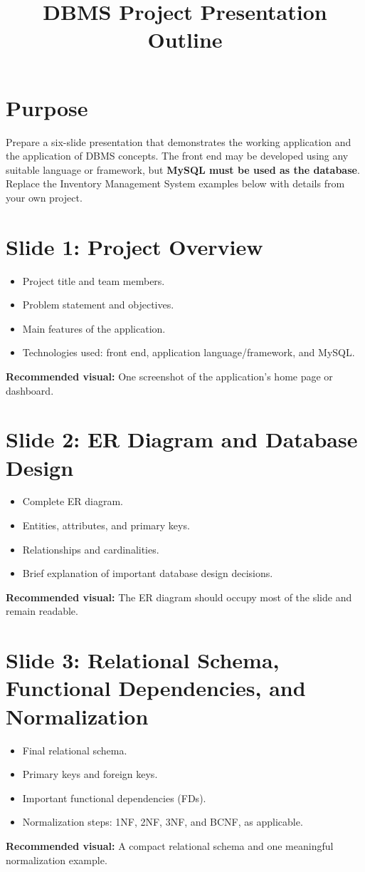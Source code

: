 \documentclass[12pt,a4paper]{article}
\title{\textbf{DBMS Project Presentation Outline}}
\author{}
\date{}
\begin{document}
\maketitle

\section*{Purpose}
Prepare a six-slide presentation that demonstrates the working application and the application of DBMS concepts. The front end may be developed using any suitable language or framework, but \textbf{MySQL must be used as the database}. Replace the Inventory Management System examples below with details from your own project.

\section*{Slide 1: Project Overview}
\begin{itemize}
    \item Project title and team members.
    \item Problem statement and objectives.
    \item Main features of the application.
    \item Technologies used: front end, application language/framework, and MySQL.
\end{itemize}
\textbf{Recommended visual:} One screenshot of the application's home page or dashboard.

\section*{Slide 2: ER Diagram and Database Design}
\begin{itemize}
    \item Complete ER diagram.
    \item Entities, attributes, and primary keys.
    \item Relationships and cardinalities.
    \item Brief explanation of important database design decisions.
\end{itemize}
\textbf{Recommended visual:} The ER diagram should occupy most of the slide and remain readable.

\section*{Slide 3: Relational Schema, Functional Dependencies, and Normalization}
\begin{itemize}
    \item Final relational schema.
    \item Primary keys and foreign keys.
    \item Important functional dependencies (FDs).
    \item Normalization steps: 1NF, 2NF, 3NF, and BCNF, as applicable.
\end{itemize}
\textbf{Recommended visual:} A compact relational schema and one meaningful normalization example.
\end{document}
